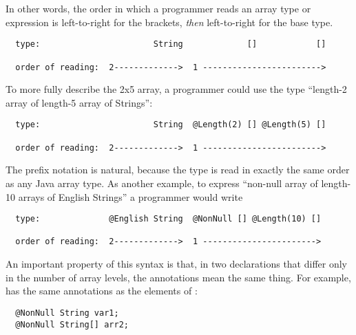 \documentclass[10pt]{article}
\begin{document}
In other words, the order in which a programmer reads an array type or
expression is left-to-right for the
brackets, \emph{then} left-to-right for the base type.

\begin{Verbatim}
  type:                       String             []            []

  order of reading:  2------------->  1 ------------------------>
\end{Verbatim}



To more fully describe the 2x5 array, a programmer could use the
type ``length-2 array of length-5 array of Strings'':

\begin{Verbatim}
  type:                       String  @Length(2) [] @Length(5) []

  order of reading:  2------------->  1 ------------------------>
\end{Verbatim}

The prefix notation is natural, because the type is read in exactly
the same order as any Java array type.  As another example, to express
``non-null array of length-10 arrays of English Strings'' a programmer
would write

\begin{Verbatim}
  type:              @English String  @NonNull [] @Length(10) []

  order of reading:  2------------->  1 ----------------------->
\end{Verbatim}




An important property of this syntax is that, in two declarations that
differ only in the number of array levels, the annotations mean the same
thing.  For example,  has
the same annotations as the elements of :

\preverbnegspace
\begin{Verbatim}
  @NonNull String var1;
  @NonNull String[] arr2;
\end{Verbatim}
\end{document}
